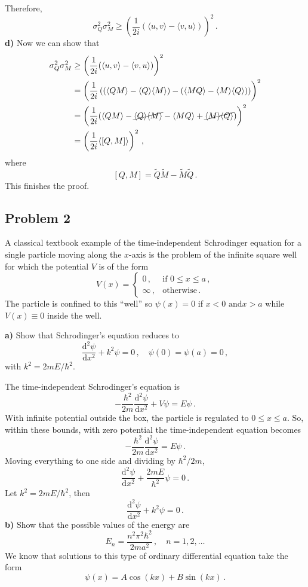 \documentclass[letterpaper,10pt]{article}
\def\expect#1{\langle #1\rangle}
\def\d{\mathrm{d}}
\begin{document}
Therefore,
\[
\sigma_Q^2\sigma_M^2\geq
\left(\frac{1}{2i}(\expect{u,v}-\expect{v,u})\right)^2\,.
\]
\textbf{d)} Now we can show that
\begin{align*}
\sigma_Q^2\sigma_M^2&\geq
\left(\frac{1}{2i}(\expect{u,v}-\expect{v,u})\right)^2\\
&=\left(\frac{1}{2i}\left((\expect{QM}-\expect{Q}\expect{M})
-(\expect{MQ}-\expect{M}\expect{Q})\right)\right)^2\\
&=\left(\frac{1}{2i}(\expect{QM}-\cancel{\expect{Q}\expect{M}}
-\expect{MQ}+\cancel{\expect{M}\expect{Q}})\right)^2\\
&=\left(\frac{1}{2i}\expect{[Q,M]}\right)^2\,,
\end{align*}
where
\[
[Q,M]=\tilde Q\tilde M-\tilde M\tilde Q\,.
\]
This finishes the proof.

\subsection*{Problem 2}
A classical textbook example of the time-independent Schrodinger equation for a
single particle moving along the $x$-axis is the problem of the infinite square
well for which the potential $V$ is of the form
\[
V(x)=
\begin{cases}
0\,,      & \text{if }0\leq x\leq a\,,\\
\infty\,, & \text{otherwise}\,.
\end{cases}
\]
The particle is confined to this ``well'' so $\psi(x)=0$ if $x < 0\text{ and
}x>a$ while $V(x)\equiv 0$ inside the well.

\textbf{a)} Show that Schrodinger's equation reduces to
\[
\frac{\d^2\psi}{\d x^2}+k^2\psi=0\,,\quad\psi(0)=\psi(a)=0\,,
\]
with $k^2=2mE/\hbar^2$.

The time-independent Schrodinger's equation is
\[
-\frac{\hbar^2}{2m}\frac{\d^2\psi}{\d x^2}+V\psi=E\psi\,.
\]
With infinite potential outside the box, the particle is regulated to $0\leq x
\leq a$. So, within these bounds, with zero potential the time-independent
equation becomes
\[
-\frac{\hbar^2}{2m}\frac{\d^2\psi}{\d x^2}=E\psi\,.
\]
Moving everything to one side and dividing by $\hbar^2/2m$,
\[
\frac{\d^2\psi}{\d x^2} + \frac{2mE}{\hbar^2}\psi=0\,.
\]
Let $k^2=2mE/\hbar^2$, then
\[
\frac{\d^2\psi}{\d x^2} + k^2\psi=0\,.
\]
\textbf{b)} Show that the possible values of the energy are
\[
E_n=\frac{n^2\pi^2\hbar^2}{2ma^2}\,,\quad n=1,2,\dots
\]
We know that solutions to this type of ordinary differential equation take the
form
\[
\psi(x)=A\cos(kx)+B\sin(kx)\,.
\]
\end{document}

